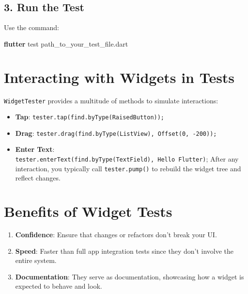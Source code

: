 \documentclass[
]{article}
\newenvironment{Shaded}{\begin{snugshade}}{\end{snugshade}}
\newcommand{\ExtensionTok}[1]{\textcolor[rgb]{0.00,0.60,1.00}{\textbf{#1}}}
\newcommand{\NormalTok}[1]{\textcolor[rgb]{0.81,0.81,0.76}{#1}}
\providecommand{\tightlist}{%
  \setlength{\itemsep}{0pt}\setlength{\parskip}{0pt}}
\begin{document}
\subsection{3. Run the Test}\label{run-the-test}

Use the command:

\begin{Shaded}
\begin{Highlighting}[]
\ExtensionTok{flutter}\NormalTok{ test path\_to\_your\_test\_file.dart}
\end{Highlighting}
\end{Shaded}

\section{Interacting with Widgets in
Tests}\label{interacting-with-widgets-in-tests}

\texttt{WidgetTester} provides a multitude of methods to simulate
interactions:

\begin{itemize}
\tightlist
\item
  \textbf{Tap}: \texttt{tester.tap(find.byType(RaisedButton));}
\item
  \textbf{Drag}:
  \texttt{tester.drag(find.byType(ListView),\ Offset(0,\ -200));}
\item
  \textbf{Enter Text}:
  \texttt{tester.enterText(find.byType(TextField),\ \textquotesingle{}Hello\ Flutter\textquotesingle{})};
  After any interaction, you typically call \texttt{tester.pump()} to
  rebuild the widget tree and reflect changes.
\end{itemize}

\section{Benefits of Widget Tests}\label{benefits-of-widget-tests}

\begin{enumerate}
\def\labelenumi{\arabic{enumi}.}
\tightlist
\item
  \textbf{Confidence}: Ensure that changes or refactors don't break your
  UI.
\item
  \textbf{Speed}: Faster than full app integration tests since they
  don't involve the entire system.
\item
  \textbf{Documentation}: They serve as documentation, showcasing how a
  widget is expected to behave and look.
\end{enumerate}
\end{document}
